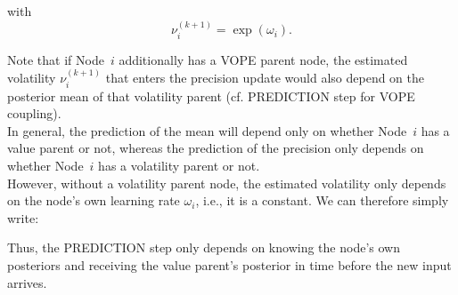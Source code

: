 \noindent
{}%
\vspace{0.5cm}

\noindent
with
\begin{equation*}
\nu_i^{(k+1)} = \exp(\omega_i).
\end{equation*}

Note that if Node~$i$ additionally has a \textsf{VOPE} parent node, the estimated volatility $\nu_i^{(k+1)}$ that enters the precision update would also depend on the posterior mean of that volatility parent (cf. \textsf{PREDICTION step} for \textsf{VOPE} coupling).\\

In general, the prediction of the mean will depend only on whether Node~$i$ has a value parent or not, whereas the prediction of the precision only depends on whether Node~$i$ has a volatility parent or not. \\

However, without a volatility parent node, the estimated volatility only depends on the node's own learning rate $\omega_i$, i.e., it is a constant. We can therefore simply write:
\vspace{0.5cm}

\noindent
{}%
\vspace{0.5cm}

\noindent

Thus, the \textsf{PREDICTION step} only depends on knowing the node's own posteriors and receiving the value parent's posterior in time before the new input arrives. \\

